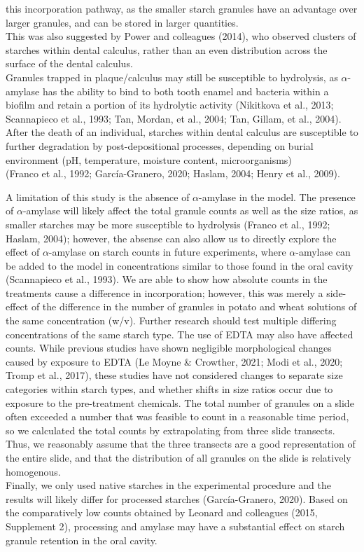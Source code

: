 \documentclass[
]{article}
\begin{document}
this incorporation pathway, as the smaller starch granules have an advantage over
larger granules, and can be stored in larger quantities.\\
This was also suggested by Power and colleagues (2014), who
observed clusters of starches within dental calculus, rather than an even
distribution across the surface of the dental calculus.\\
Granules trapped
in plaque/calculus may still be susceptible to hydrolysis, as \(\alpha\)-amylase has
the ability to bind to both tooth enamel and bacteria within a biofilm and retain
a portion of its hydrolytic activity
(Nikitkova et al., 2013; Scannapieco et al., 1993; Tan, Mordan, et al., 2004; Tan, Gillam, et al., 2004).
After the death of an individual, starches within dental calculus are susceptible
to further degradation by post-depositional processes, depending on burial environment
(pH, temperature, moisture content, microorganisms)\\
(Franco et al., 1992; García-Granero, 2020; Haslam, 2004; Henry et al., 2009).

A limitation of this study
is the absence of \(\alpha\)-amylase in the model. The presence of \(\alpha\)-amylase will likely affect
the total granule counts as well as the size ratios, as smaller starches may be more
susceptible to hydrolysis
(Franco et al., 1992; Haslam, 2004); however,
the absense can also allow us to directly explore
the effect of \(\alpha\)-amylase on starch counts in future experiments,
where \(\alpha\)-amylase can be added to the model
in concentrations similar to those found in the oral cavity (Scannapieco et al., 1993).
We are able to show how absolute counts in the treatments cause a difference in
incorporation; however, this
was merely a side-effect of the difference in the number of granules in potato and
wheat solutions of the same concentration (w/v). Further research should test
multiple differing concentrations of the same starch type.
The use of EDTA may also have affected counts. While previous studies have shown
negligible morphological changes caused by exposure to EDTA
(Le Moyne \& Crowther, 2021; Modi et al., 2020; Tromp et al., 2017),
these studies have not considered changes to separate size
categories within starch types, and whether shifts in size ratios occur due to
exposure to the pre-treatment chemicals.
The total number of granules on a slide often exceeded a number that
was feasible to count in a reasonable time period, so we calculated the total
counts by extrapolating from three slide transects.
Thus, we reasonably assume that the three transects are a good representation
of the entire slide, and that the distribution of all granules on the slide is
relatively homogenous.\\
Finally, we only used native starches in the experimental procedure and the results
will likely differ for processed starches (García-Granero, 2020).
Based on the comparatively low counts obtained by Leonard
and colleagues (2015, Supplement 2), processing and amylase
may have a substantial effect on starch granule retention in the oral cavity.
\end{document}
